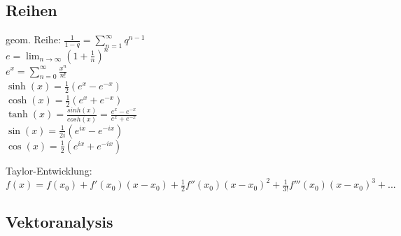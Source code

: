 \documentclass[12pt,a4paper]{article}
\renewcommand{\=}[1]{\stackrel{#1}{=}}
\theoremstyle{definition}
\theoremstyle{remark}
\begin{document}
\subsection{Reihen}

\begin{center}
\begin{minipage}[t]{.49\linewidth}
\vspace{0pt}
geom. Reihe: $\frac{1}{1-q} = \sum_{n = 1}^{\infty} q^{n-1}$\\
$e = \lim_{n \rightarrow \infty} (1 + \frac{1}{n})^n$\\
$e^x = \sum_{n=0}^{\infty} \frac{x^n}{n!}$\\
$\sinh(x) = \frac{1}{2} (e^x - e^{-x})$\\
$\cosh(x) = \frac{1}{2} (e^x + e^{-x})$\\
$\tanh(x) = \frac{sinh(x)}{cosh(x)} = \frac{e^x - e^{-x}}{e^x + e^{-x}}$\\
$\sin(x) = \frac{1}{2i}(e^{ix} - e^{-ix})$\\
$\cos(x) = \frac{1}{2}(e^{ix}+e^{-ix})$
\end{minipage}%
\begin{minipage}[t]{.49\linewidth}
\vspace{0pt}

\begin{framed}
Taylor-Entwicklung: $f(x) = f(x_0) + f'(x_0) (x-x_0) + \frac{1}{2} f''(x_0)(x-x_0)^2 + \frac{1}{3!} f'''(x_0) (x-x_0)^3 + ...$
\end{framed}

\end{minipage}
\end{center}


\subsection{Vektoranalysis}
\end{document}

